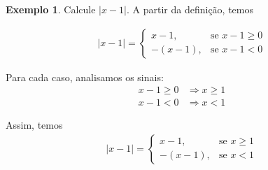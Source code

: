 \documentclass[12pt,openright,twoside,a4paper]{article}
\theoremstyle{definition}
\newtheorem{example}{Exemplo}[section]
\begin{document}
	\begin{example}Calcule $|x - 1|$. A partir da definição, temos
		
		\begin{align*}
			|x - 1| =
			\begin{cases}
				x - 1, & \text{se } x - 1 \geq 0 \\
				- (x - 1), & \text{se } x - 1 < 0
			\end{cases}
		\end{align*}
		
		Para cada caso, analisamos os sinais:
		\begin{align*}
			x - 1 \geq 0 &\Rightarrow x \geq 1 \\
			x - 1 < 0 & \Rightarrow x < 1
		\end{align*}
		
		Assim, temos
		\begin{align*}
			|x - 1| =
			\begin{cases}
				x - 1, & \text{se } x \geq 1 \\
				- (x - 1), & \text{se }  x < 1
			\end{cases}
		\end{align*}
	\end{example}
	
\end{document}
